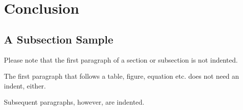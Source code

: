 \section{Conclusion}
\subsection{A Subsection Sample}
Please note that the first paragraph of a section or subsection is not indented. 

The first paragraph that follows a table, figure,
equation etc. does not need an indent, either.

Subsequent paragraphs, however, are indented.